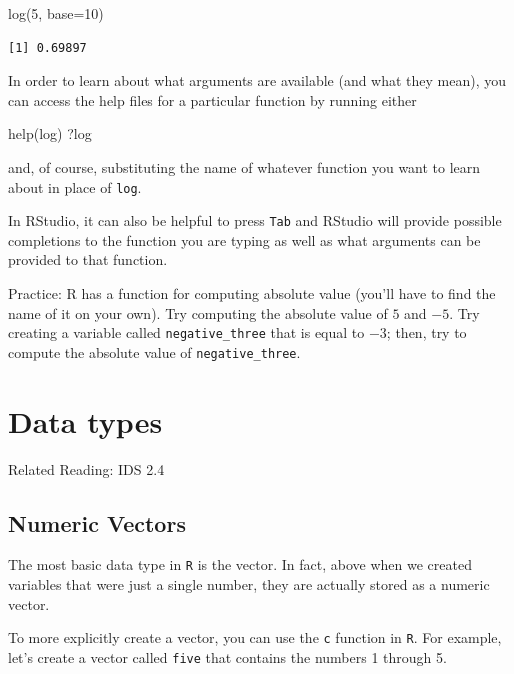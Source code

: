 \documentclass[
  letterpaper,
  DIV=11,
  numbers=noendperiod]{scrreprt}
\newenvironment{Shaded}{\begin{snugshade}}{\end{snugshade}}
\newcommand{\AttributeTok}[1]{\textcolor[rgb]{0.40,0.45,0.13}{#1}}
\newcommand{\DecValTok}[1]{\textcolor[rgb]{0.68,0.00,0.00}{#1}}
\newcommand{\FunctionTok}[1]{\textcolor[rgb]{0.28,0.35,0.67}{#1}}
\newcommand{\NormalTok}[1]{\textcolor[rgb]{0.00,0.23,0.31}{#1}}
\begin{document}
\begin{Shaded}
\begin{Highlighting}[]
\FunctionTok{log}\NormalTok{(}\DecValTok{5}\NormalTok{, }\AttributeTok{base=}\DecValTok{10}\NormalTok{)}
\end{Highlighting}
\end{Shaded}

\begin{verbatim}
[1] 0.69897
\end{verbatim}

In order to learn about what arguments are available (and what they
mean), you can access the help files for a particular function by
running either

\begin{Shaded}
\begin{Highlighting}[]
\FunctionTok{help}\NormalTok{(log)}
\NormalTok{?log}
\end{Highlighting}
\end{Shaded}

and, of course, substituting the name of whatever function you want to
learn about in place of \texttt{log}.

In RStudio, it can also be helpful to press \texttt{Tab} and RStudio
will provide possible completions to the function you are typing as well
as what arguments can be provided to that function.

{Practice:} R has a function for computing absolute value (you'll have
to find the name of it on your own). Try computing the absolute value of
\(5\) and \(-5\). Try creating a variable called
\texttt{negative\_three} that is equal to \(-3\); then, try to compute
the absolute value of \texttt{negative\_three}.

\section{Data types}\label{data-types}

Related Reading: IDS 2.4

\subsection{Numeric Vectors}\label{numeric-vectors}

The most basic data type in \texttt{R} is the vector. In fact, above
when we created variables that were just a single number, they are
actually stored as a numeric vector.

To more explicitly create a vector, you can use the \texttt{c} function
in \texttt{R}. For example, let's create a vector called \texttt{five}
that contains the numbers 1 through 5.
\end{document}
